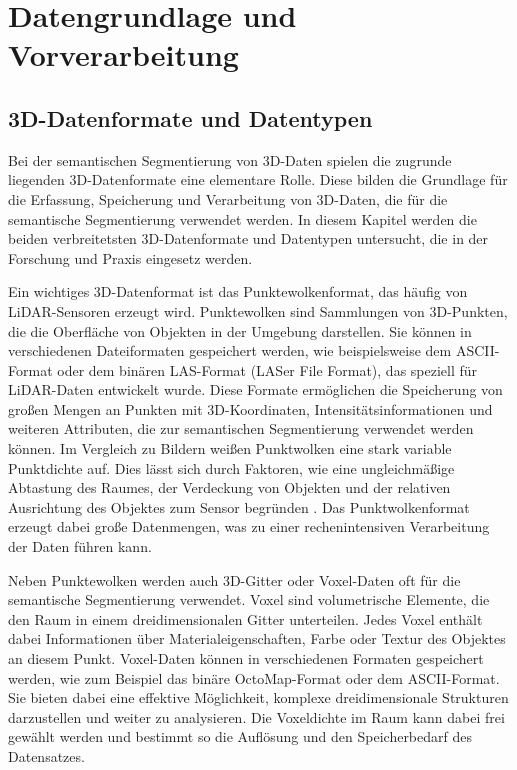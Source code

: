 \chapter{Datengrundlage und Vorverarbeitung}

\section{3D-Datenformate und Datentypen}
Bei der semantischen Segmentierung von 3D-Daten spielen die zugrunde liegenden
3D-Datenformate eine elementare Rolle. Diese bilden die Grundlage für die
Erfassung, Speicherung und Verarbeitung von 3D-Daten, die für die semantische
Segmentierung verwendet werden. In diesem Kapitel werden die beiden
verbreitetsten 3D-Datenformate und Datentypen untersucht, die in der Forschung
und Praxis eingesetz werden.

Ein wichtiges 3D-Datenformat ist das Punktewolkenformat, das häufig von
LiDAR-Sensoren erzeugt wird. Punktewolken sind Sammlungen von 3D-Punkten, die
die Oberfläche von Objekten in der Umgebung darstellen. Sie können in
verschiedenen Dateiformaten gespeichert werden, wie beispielsweise dem
ASCII-Format oder dem binären LAS-Format (LASer File Format), das speziell für
LiDAR-Daten entwickelt wurde. Diese Formate ermöglichen die Speicherung von
großen Mengen an Punkten mit 3D-Koordinaten, Intensitätsinformationen und
weiteren Attributen, die zur semantischen Segmentierung verwendet werden
können. Im Vergleich zu Bildern weißen Punktwolken eine stark variable
Punktdichte auf. Dies lässt sich durch Faktoren, wie eine ungleichmäßige
Abtastung des Raumes, der Verdeckung von Objekten und der relativen Ausrichtung
des Objektes zum Sensor begründen \cite{8578570}. Das Punktwolkenformat erzeugt
dabei große Datenmengen, was zu einer rechenintensiven Verarbeitung der Daten
führen kann.

Neben Punktewolken werden auch 3D-Gitter oder Voxel-Daten oft für die
semantische Segmentierung verwendet. Voxel sind volumetrische Elemente, die den
Raum in einem dreidimensionalen Gitter unterteilen. Jedes Voxel enthält dabei
Informationen über Materialeigenschaften, Farbe oder Textur des Objektes an
diesem Punkt. Voxel-Daten können in verschiedenen Formaten gespeichert werden,
wie zum Beispiel das binäre OctoMap-Format oder dem ASCII-Format. Sie bieten
dabei eine effektive Möglichkeit, komplexe dreidimensionale Strukturen
darzustellen und weiter zu analysieren. Die Voxeldichte im Raum kann dabei frei
gewählt werden und bestimmt so die Auflösung und den Speicherbedarf des
Datensatzes.

